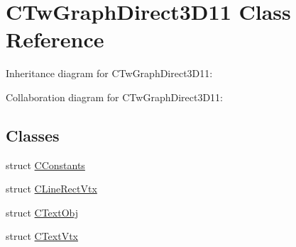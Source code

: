 \hypertarget{class_c_tw_graph_direct3_d11}{\section{C\+Tw\+Graph\+Direct3\+D11 Class Reference}
\label{class_c_tw_graph_direct3_d11}
}


Inheritance diagram for C\+Tw\+Graph\+Direct3\+D11\+:


Collaboration diagram for C\+Tw\+Graph\+Direct3\+D11\+:
\subsection*{Classes}
\begin{DoxyCompactItemize}
\item 
struct \hyperlink{struct_c_tw_graph_direct3_d11_1_1_c_constants}{C\+Constants}
\item 
struct \hyperlink{struct_c_tw_graph_direct3_d11_1_1_c_line_rect_vtx}{C\+Line\+Rect\+Vtx}
\item 
struct \hyperlink{struct_c_tw_graph_direct3_d11_1_1_c_text_obj}{C\+Text\+Obj}
\item 
struct \hyperlink{struct_c_tw_graph_direct3_d11_1_1_c_text_vtx}{C\+Text\+Vtx}
\end{DoxyCompactItemize}
